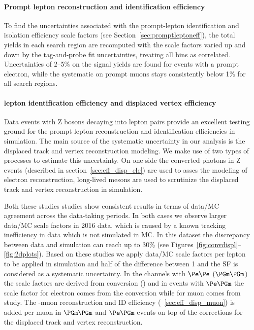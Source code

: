 \paragraph{Prompt lepton reconstruction and identification efficiency}
\label{sec:promptleptoneffsysts}
To find the uncertainties associated with the prompt-lepton
identification and isolation efficiency scale factors (see
Section~\ref{sec:promptleptoneff}),
the total yields in each search region are recomputed with the scale
factors varied up and down by the tag-and-probe fit uncertainties,
treating all bins as correlated.
Uncertainties of 2--5\% on the signal yields are found
for events with a prompt electron, while the systematic on prompt
muons stays consistently below 1\% for all search regions.

\paragraph{\Displ lepton identification efficiency and displaced vertex efficiency }
\label{sec:nonpromptleptoneffsysts}
Data events with Z bosons decaying into lepton pairs provide an excellent testing ground for the prompt lepton 
reconstruction and identification efficiencies in simulation.
The main source of the systematic uncertainty in our analysis is the displaced track and vertex reconstruction modeling. 
We make use of two types of processes to estimate this uncertainty. On one side the converted photons in Z events (described in section~\ref{sec:eff_disp_ele}) 
are used to asses the modeling of \displ electron reconstruction,  long-lived \PKzS 
mesons are used to scrutinize the displaced track and vertex reconstruction in simulation. 

Both these studies studies show consistent results in terms of data/MC agreement across the data-taking periods. 
In both cases we observe larger data/MC scale factors in 2016 data, which is caused by a known tracking inefficiency 
in data which is not simulated in MC. In this dataset the discrepancy
between data and simulation can reach up to 30\% (see
Figures~\ref{fig:convdispl}--\ref{fig:2dplots}).
Based on these studies we apply data/MC scale factors per \displ
lepton to be applied in simulation and half of the difference between
1 and the SF is considered as a systematic uncertainty.  
In the channels with \displ $\Pe\Pe$ ($\PGm\PGm$) the scale factors
are derived from conversion (\PKzS) and in events with \displ $\Pe\PGm$ the 
scale factor for electron comes from the conversion while for muon
comes from \PKzS study. The \displ-muon reconstruction and ID
efficiency (~\ref{sec:eff_disp_muon}) is added per muon in 
$\PGm\PGm$ and $\Pe\PGm$ events on top of the corrections for the displaced
track and vertex reconstruction.


